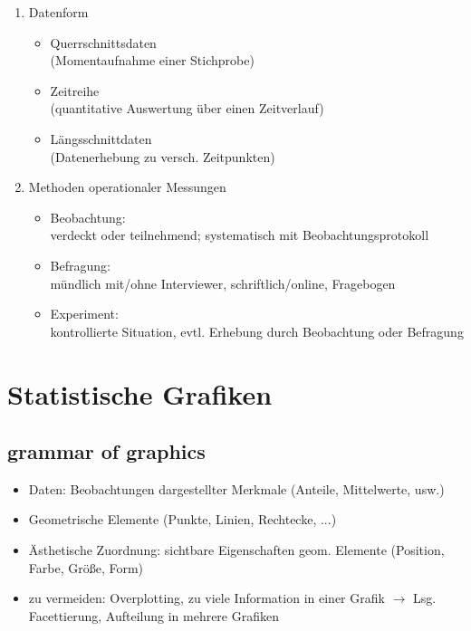 \documentclass[10pt,a4paper,landscape]{article}
\begin{document}
\begin{multicols}{4}
\begin{enumerate}
\item Datenform

\begin{itemize}
\item Querrschnittsdaten\\
	(Momentaufnahme einer Stichprobe)
\item Zeitreihe\\
	(quantitative Auswertung über einen Zeitverlauf)
\item Längsschnittdaten\\
	(Datenerhebung zu versch. Zeitpunkten)
\end{itemize}

\item Methoden operationaler Messungen

\begin{itemize}
\item Beobachtung:\\
verdeckt oder teilnehmend; systematisch mit Beobachtungsprotokoll
\item Befragung: \\
mündlich mit/ohne Interviewer, schriftlich/online, Fragebogen
\item Experiment: \\
kontrollierte Situation, evtl. Erhebung durch Beobachtung oder Befragung
\end{itemize}

\end{enumerate}


\section{Statistische Grafiken}

\subsection{grammar of graphics}
\begin{itemize}
\item Daten: Beobachtungen dargestellter Merkmale (Anteile, Mittelwerte, usw.)
\item Geometrische Elemente (Punkte, Linien, Rechtecke, ...)
\item Ästhetische Zuordnung: sichtbare Eigenschaften geom. Elemente (Position, Farbe, Größe, Form)
\item zu vermeiden: Overplotting, zu viele Information in einer Grafik $\rightarrow$ Lsg. Facettierung, Aufteilung in mehrere Grafiken
\end{itemize}


\end{multicols}
\end{document}
